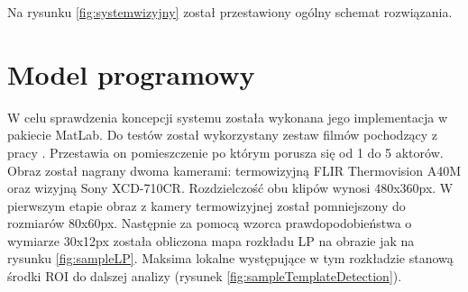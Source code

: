 Na rysunku \ref{fig:systemwizyjny} został przestawiony ogólny schemat rozwiązania.

\section{Model programowy}
W celu sprawdzenia koncepcji systemu została wykonana jego implementacja w pakiecie MatLab. Do testów został wykorzystany zestaw filmów pochodzący z pracy \cite{bilodeau2014thermal}.   Przestawia on pomieszczenie po którym porusza się od 1 do 5 aktorów. Obraz został nagrany dwoma kamerami: termowizyjną FLIR Thermovision A40M oraz wizyjną Sony XCD-710CR. Rozdzielczość obu klipów wynosi 480x360px. W pierwszym etapie obraz z kamery termowizyjnej został pomniejszony do rozmiarów 80x60px. Następnie za pomocą wzorca prawdopodobieństwa  o wymiarze 30x12px została obliczona mapa rozkładu LP na obrazie jak na rysunku \ref{fig:sampleLP}. Maksima lokalne występujące w tym rozkładzie stanową środki ROI do dalszej analizy (rysunek \ref{fig:sampleTemplateDetection}). 
